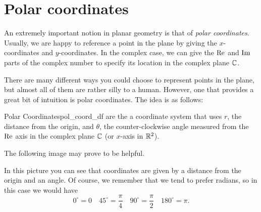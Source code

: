         \section{Polar coordinates}
        An extremely important notion in planar geometry is that of \emph{polar coordinates}. Usually, we are happy to reference a point in the plane by giving the $x$-coordinates and $y$-coordinates.  In the complex case, we can give the $\mathrm{Re}$ and $\mathrm{Im}$ parts of the complex number to specify its location in the complex plane $\mathbb{C}$.

        There are many different ways you could choose to represent points in the plane, but almost all of them are rather silly to a human.  However, one that provides a great bit of intuition is polar coordinates. The idea is as follows:

        \begin{df}{Polar Coordinates}{pol_coord_df}
         are the a coordinate system that uses $r$, the distance from the origin, and $\theta$, the counter-clockwise angle measured from the $\mathrm{Re}$ axis in the complex plane $\mathbb{C}$ (or $x$-axis in $\mathbb{R}^2$).
        \end{df}

        The following image may prove to be helpful.

        \begin{center}
\end{center}
In this picture you can see that coordinates are given by a distance from the origin and an angle.  Of course, we remember that we tend to prefer radians, so in this case we would have
\[
0^\circ = 0 \quad 45^\circ = \frac{\pi}{4} \quad 90^\circ = \frac{\pi}{2} \quad 180^\circ = \pi.
\]

